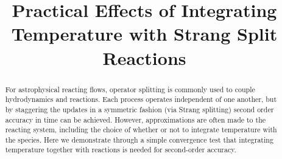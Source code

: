 \documentclass[times,modern]{aastex63}
\begin{document}
\title{Practical Effects of Integrating Temperature with Strang Split Reactions}



\shortauthors{}








\begin{abstract}
For astrophysical reacting flows, operator splitting is commonly used
to couple hydrodynamics and reactions.  Each process operates
independent of one another, but by staggering the updates in a
symmetric fashion (via Strang splitting) second order accuracy in time
can be achieved.  However, approximations are often made to the
reacting system, including the choice of whether or not to integrate
temperature with the species.  Here we demonstrate through a simple
convergence test that integrating temperature together with reactions
is needed for second-order accuracy.
\end{abstract}

\end{document}
